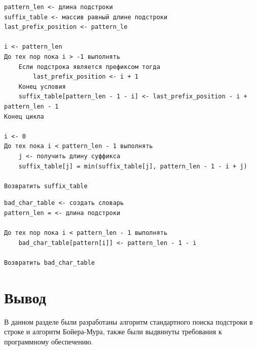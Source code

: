 \begin{lstlisting}[label=lst:suff, caption = Псевдокод создания таблицы суффиксов]
pattern_len <- длина подстроки
suffix_table <- массив равный длине подстроки
last_prefix_position <- pattern_le

i <- pattern_len
До тех пор пока i > -1 выполнять
    Если подстрока является префиксом тогда
        last_prefix_position <- i + 1
    Конец условия
    suffix_table[pattern_len - 1 - i] <- last_prefix_position - i + pattern_len - 1
Конец цикла

i <- 0
До тех пока i < pattern_len - 1 выполнять
    j <- получить длину суффикса
    suffix_table[j] = min(suffix_table[j], pattern_len - 1 - i + j)

Возвратить suffix_table
\end{lstlisting}

\begin{lstlisting}[label=lst:stop, caption = Псевдокод создания таблицы стоп-символа]
bad_char_table <- создать словарь
pattern_len = <- длина подстроки

До тех пор пока i < pattern_len - 1 выполнять
    bad_char_table[pattern[i]] <- pattern_len - 1 - i

Возвратить bad_char_table
\end{lstlisting}

\section*{Вывод}

В данном разделе были разработаны алгоритм стандартного поиска подстроки в строке и алгоритм Бойера-Мура, также были 
выдвинуты требования к программному обеспечению.

